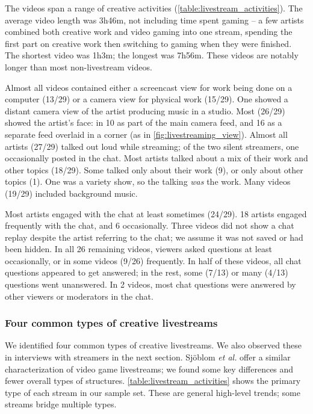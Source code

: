 The videos span a range of creative activities (\autoref{table:livestream_activities}). The average video length was 3h46m, not including time spent gaming -- a few artists combined both creative work and video gaming into one stream, spending the first part on creative work then switching to gaming when they were finished. The shortest video was 1h3m; the longest was 7h56m. These videos are notably longer than most non-livestream videos.

Almost all videos contained either a screencast view for work being done on a computer (13/29) or a camera view for physical work (15/29). One showed a distant camera view of the artist producing music in a studio. Most (26/29) showed the artist's face: in 10 as part of the main camera feed, and 16 as a separate feed overlaid in a corner (as in \autoref{fig:livestreaming_view}). Almost all artists (27/29) talked out loud while streaming; of the two silent streamers, one occasionally posted in the chat. Most artists talked about a mix of their work and other topics (18/29). Some talked only about their work (9), or only about other topics (1). One was a variety show, so the talking \textit{was} the work. Many videos (19/29) included background music. 

Most artists engaged with the chat at least sometimes (24/29). 18 artists engaged frequently with the chat, and 6 occasionally. Three videos did not show a chat replay despite the artist referring to the chat; we assume it was not saved or had been hidden. In all 26 remaining videos, viewers asked questions at least occasionally, or in some videos (9/26) frequently. In half of these videos, all chat questions appeared to get answered; in the rest, some (7/13) or many (4/13) questions went unanswered. In 2 videos, most chat questions were answered by other viewers or moderators in the chat.

\subsubsection{Four common types of creative livestreams}
We identified four common types of creative livestreams. We also observed these in interviews with streamers in the next section. Sj{\"{o}}blom \textit{et al.} \cite{Sjoblom2017a} offer a similar characterization of video game livestreams; we found some key differences and fewer overall types of structures. \autoref{table:livestream_activities} shows the primary type of each stream in our sample set. These are general high-level trends; some streams bridge multiple types.

